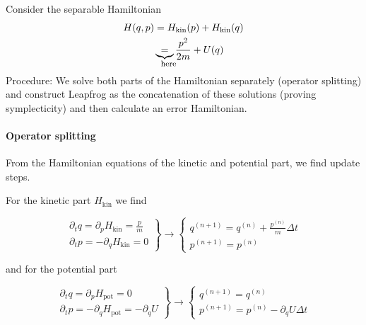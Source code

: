 Consider the separable Hamiltonian
\begin{equation}
  \begin{aligned}
    H(q,p) &= H_{\text{kin}}(p) + H_{\text{kin}}(q) \\
           &\explain{=}{here} \frac{p^2}{2m} + U(q)
  \end{aligned}
\end{equation}
\textcolor{blue1}{Procedure}: We solve both parts of the Hamiltonian separately (operator splitting) and construct Leapfrog as
the concatenation of these solutions (proving symplecticity) and then calculate an error Hamiltonian.

\paragraph{Operator splitting} From the Hamiltonian equations of the kinetic and potential part, we find update steps.

For the kinetic part $H_{\text{kin}}$ we find

\begin{equation}
  \left.\begin{array}{c}
  \partial_t q=\partial_p H_{\text{kin}}=\frac{p}{m} \\
  \partial_t p=-\partial_q H_{\text{kin}}= 0
  \end{array}\right\} \rightarrow\left\{\begin{array}{c}
  q^{(n+1)}=q^{(n)}+\frac{p^{(n)}}{m} \Delta t \\
  p^{(n+1)}=p^{(n)}
  \end{array}\right.
\end{equation}

and for the potential part

\begin{equation}
  \left.\begin{array}{c}
  \partial_t q=\partial_p H_{\text{pot}}=0 \\
  \partial_t p=-\partial_q H_{\text{pot}}= -\partial_q U
  \end{array}\right\} \rightarrow\left\{\begin{array}{c}
  q^{(n+1)}=q^{(n)} \\
  p^{(n+1)}=p^{(n)} - \partial_q U \Delta t
  \end{array}\right.
\end{equation}



